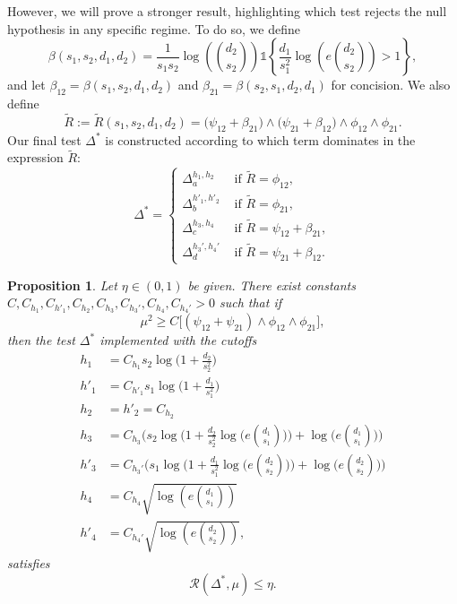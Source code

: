 \documentclass{article}
\newcommand{\cR}{\mathcal{R}}
\newcommand{\one}{\mathds{1}}
\newtheorem{proposition}{Proposition}
\theoremstyle{remark}
\begin{document}
However, we will prove a stronger result, highlighting which test rejects the null hypothesis in any specific regime. To do so, we define
\begin{equation}\label{eq_def_beta}
    \beta(s_1, s_2, d_1, d_2) = \frac{1}{s_1 s_2}\log\left({d_2 \choose s_2}\right)\one{\left\{\frac{d_1}{s_1^2}\log\left(e{d_2 \choose s_2}\right) > 1\right\}},
\end{equation}
and let $\beta_{12} = \beta(s_1, s_2, d_1, d_2)$ and $\beta_{21} = \beta(s_2, s_1, d_2, d_1)$ for concision. We also define
\begin{equation}
    \tilde{R} := \tilde{R}(s_1, s_2, d_1, d_2) = \big(\psi_{12} + \beta_{21}\big) \land \big(\psi_{21} + \beta_{12}\big) \land \phi_{12} \land \phi_{21}.
\end{equation}
Our final test $\Delta^*$ is constructed according to which term dominates in the expression $\tilde{R}$:
\begin{equation}\label{eq:delta-optimal}
    \Delta^* = \begin{cases}
        \Delta_a^{h_1, h_2} & \text{ if } \tilde R = \phi_{12}, \\
        \Delta_b^{h'_1, h'_2} & \text{ if } \tilde R = \phi_{21}, \\
        \Delta_c^{h_3, h_4} & \text{ if } \tilde R = \psi_{12} + \beta_{21},\\
        \Delta_d^{h_3', h_4'} & \text{ if } \tilde R = \psi_{21} + \beta_{12}.
    \end{cases}
\end{equation}
\begin{proposition}\label{prop_ub}
    Let $\eta \in (0,1)$ be given. There exist constants $C, C_{h_1}, C_{h'_1}, C_{h_2}, C_{h_3}, C_{h_3'}, C_{h_4}, C_{h_4'} > 0$ such that if
    \[\mu^2 \geq C\big[(\psi_{12} + \psi_{21}) \land \phi_{12} \land \phi_{21}\big],\]
    then the test $\Delta^*$ implemented with the cutoffs
    \begin{align*}
        h_1 &= C_{h_1}s_2\log\big(1 + \frac{d_2}{s_2^2}\big) \\
        h'_1 &= C_{h'_1}s_1\log\big(1 + \frac{d_1}{s_1^2}\big) \\
        h_2 &= h'_2 = C_{h_2} \\
        h_3 &= C_{h_3}\Big(s_2\log\Big(1 + \frac{d_2}{s_2^2}\log \Big(e{d_1 \choose s_1}\Big)\Big) + \log \Big(e {d_1 \choose s_1}\Big)\Big) \\
        h'_3 &= C_{h_3'}\Big(s_1\log\Big(1 + \frac{d_1}{s_1^2}\log \Big(e{d_2 \choose s_2}\Big)\Big) + \log \Big(e{d_2 \choose s_2}\Big)\Big)\\
        h_4 &=  C_{h_4}\sqrt{\log\left(e {d_1 \choose s_1}\right)} \\
        h'_4 &=  C_{h_4'}\sqrt{\log\left(e {d_2 \choose s_2}\right)},
    \end{align*}
    satisfies
    \[\cR(\Delta^*, \mu) \leq \eta.\]
\end{proposition}
\end{document}
